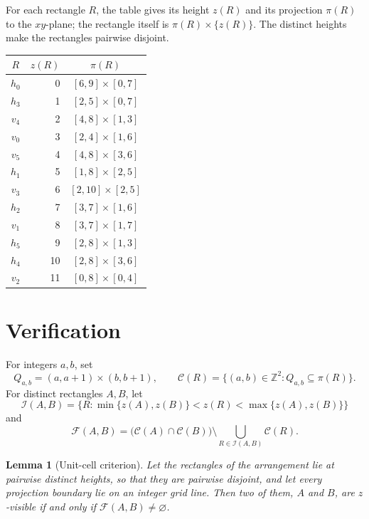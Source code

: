 \documentclass[11pt]{amsart}
\newtheorem{lemma}[theorem]{Lemma}
\begin{document}
For each rectangle $R$, the table gives its height $z(R)$ and its projection
$\pi(R)$ to the $xy$-plane; the rectangle itself is
$\pi(R)\times\{z(R)\}$.  The distinct heights make the rectangles pairwise
disjoint.

\begin{center}
\small
\begin{tabular}{@{}c r c@{}}
\toprule
$R$ & $z(R)$ & $\pi(R)$ \\
\midrule
$h_0$ & 0  & $[6,9]\times[0,7]$ \\
$h_3$ & 1  & $[2,5]\times[0,7]$ \\
$v_4$ & 2  & $[4,8]\times[1,3]$ \\
$v_0$ & 3  & $[2,4]\times[1,6]$ \\
$v_5$ & 4  & $[4,8]\times[3,6]$ \\
$h_1$ & 5  & $[1,8]\times[2,5]$ \\
$v_3$ & 6  & $[2,10]\times[2,5]$ \\
$h_2$ & 7  & $[3,7]\times[1,6]$ \\
$v_1$ & 8  & $[3,7]\times[1,7]$ \\
$h_5$ & 9  & $[2,8]\times[1,3]$ \\
$h_4$ & 10 & $[2,8]\times[3,6]$ \\
$v_2$ & 11 & $[0,8]\times[0,4]$ \\
\bottomrule
\end{tabular}
\end{center}

\section{Verification}

For integers $a,b$, set
\[
  Q_{a,b}=(a,a+1)\times(b,b+1),
  \qquad
  \mathcal C(R)=
  \{(a,b)\in\mathbb Z^2:Q_{a,b}\subseteq\pi(R)\}.
\]
For distinct rectangles $A,B$, let
\[
  \mathcal I(A,B)=
  \{R:\min\{z(A),z(B)\}<z(R)<\max\{z(A),z(B)\}\}
\]
and
\[
  \mathcal F(A,B)=
  \bigl(\mathcal C(A)\cap\mathcal C(B)\bigr)
  \setminus
  \bigcup_{R\in\mathcal I(A,B)}\mathcal C(R).
\]

\begin{lemma}[Unit-cell criterion]\label{lem:cells}
Let the rectangles of the arrangement lie at pairwise distinct heights, so that
they are pairwise disjoint, and let every projection boundary lie on an integer
grid line.  Then two of them, $A$ and $B$, are $z$-visible if and only if
$\mathcal F(A,B)\ne\varnothing$.
\end{lemma}
\end{document}
